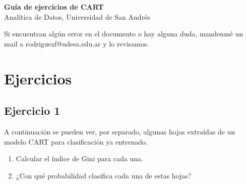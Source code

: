 \documentclass[12pt]{article}
\begin{document}
\begin{center}
  {\LARGE \textbf{Guía de ejercicios de CART}}\\[0.5em]
  {Analítica de Datos, Universidad de San Andrés}
\end{center}

Si encuentran algún error en el documento o hay alguna duda, mandenmé un mail a rodriguezf@udesa.edu.ar y lo revisamos.

\section{Ejercicios}

\subsection{Ejercicio 1}

A continuación se pueden ver, por separado, algunas hojas extraídas de un modelo CART para clasificación ya entrenado.
  
    \begin{center}
    \end{center}

    \begin{enumerate}
      \item Calcular el índice de Gini para cada una.
      \item ¿Con qué probabilidad clasifica cada una de estas hojas?
    \end{enumerate}
\end{document}
